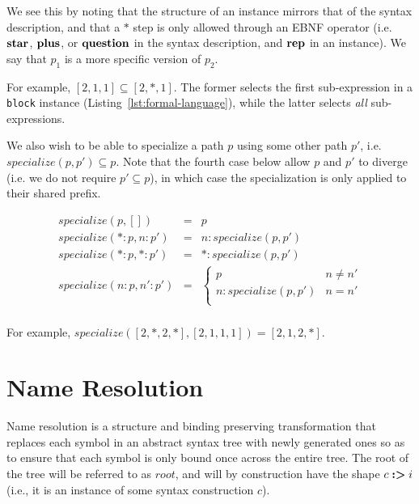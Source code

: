 \documentclass{kththesis}
\begin{document}
We see this by noting that the structure of an instance mirrors that of the syntax description, and that a $*$ step is only allowed through an EBNF operator (i.e. $\mathrel{\mathbf{star}}$, $\mathrel{\mathbf{plus}}$, or $\mathrel{\mathbf{question}}$ in the syntax description, and $\mathrel{\mathbf{rep}}$ in an instance). We say that $p_1$ is a more specific version of $p_2$.

For example, $[2, 1, 1] \subseteq [2, *, 1]$. The former selects the first sub-expression in a \texttt{block} instance (Listing~\ref{lst:formal-language}), while the latter selects \emph{all} sub-expressions.

\newcommand{\specialize}{\ensuremath{\mathit{specialize}}}

We also wish to be able to specialize a path $p$ using some other path $p'$, i.e. $\specialize(p, p') \subseteq p$. Note that the fourth case below allow $p$ and $p'$ to diverge (i.e. we do not require $p' \subseteq p$), in which case the specialization is only applied to their shared prefix.

$$
\begin{array}{rcl}
\specialize(p, []) & = & p \\
\specialize(*:p, n:p') & = & n : \specialize(p, p') \\
\specialize(*:p, *:p') & = & * : \specialize(p, p') \\
\specialize(n:p, n':p') & = &
\begin{cases}
  p & n \neq n' \\
  n : \specialize(p, p') & n = n' \\
\end{cases} \\
\end{array}
$$

For example, $\specialize([2, *, 2, *], [2, 1, 1, 1]) = [2, 1, 2, *]$.

\section{Name Resolution} \label{sec:name-resolution}

\newcommand{\rooti}{\ensuremath{\mathit{root}}}

Name resolution is a structure and binding preserving transformation that replaces each symbol in an abstract syntax tree with newly generated ones so as to ensure that each symbol is only bound once across the entire tree. The root of the tree will be referred to as \rooti, and will by construction have the shape $c \mathrel{\textbf{:>}} i$ (i.e., it is an instance of some syntax construction $c$).
\end{document}
